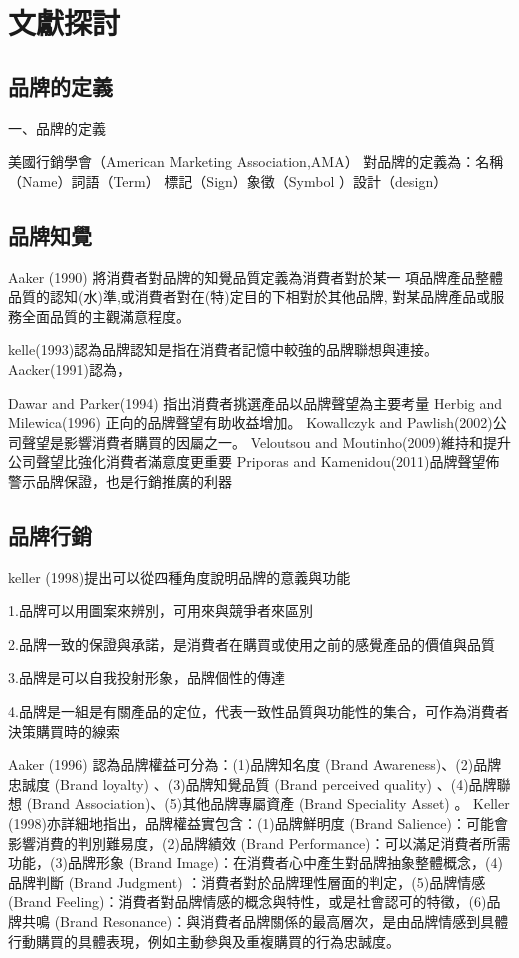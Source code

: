 \chapter{文獻探討}


\section{品牌的定義}

一、品牌的定義

美國行銷學會（American Marketing Association,AMA）
對品牌的定義為：名稱 （Name）詞語（Term） 標記（Sign）象徵（Symbol ）設計（design）


\section{品牌知覺}
Aaker (1990) 將消費者對品牌的知覺品質定義為消費者對於某一 項品牌產品整體品質的認知(水)準,或消費者對在(特)定目的下相對於其他品牌, 對某品牌產品或服務全面品質的主觀滿意程度。

kelle(1993)認為品牌認知是指在消費者記憶中較強的品牌聯想與連接。Aacker(1991)認為，

Dawar and Parker(1994) 指出消費者挑選產品以品牌聲望為主要考量
Herbig and Milewica(1996) 正向的品牌聲望有助收益增加。
Kowallczyk and Pawlish(2002)公司聲望是影響消費者購買的因屬之一。
Veloutsou and Moutinho(2009)維持和提升公司聲望比強化消費者滿意度更重要
Priporas and Kamenidou(2011)品牌聲望佈警示品牌保證，也是行銷推廣的利器
\section{品牌行銷}

keller (1998)提出可以從四種角度說明品牌的意義與功能\cite{Aaker}

1.品牌可以用圖案來辨別，可用來與競爭者來區別

2.品牌一致的保證與承諾，是消費者在購買或使用之前的感覺產品的價值與品質

3.品牌是可以自我投射形象，品牌個性的傳達

4.品牌是一組是有關產品的定位，代表一致性品質與功能性的集合，可作為消費者決策購買時的線索

Aaker (1996) 認為品牌權益可分為：(1)品牌知名度 (Brand Awareness)、(2)品牌忠誠度 (Brand loyalty) 、(3)品牌知覺品質 (Brand perceived quality) 、(4)品牌聯想 (Brand Association)、(5)其他品牌專屬資產 (Brand Speciality Asset) 。
    Keller (1998)亦詳細地指出，品牌權益實包含：(1)品牌鮮明度 (Brand Salience)：可能會影響消費的判別難易度，(2)品牌績效 (Brand Performance)：可以滿足消費者所需功能，(3)品牌形象 (Brand Image)：在消費者心中產生對品牌抽象整體概念，(4)品牌判斷 (Brand Judgment) ：消費者對於品牌理性層面的判定，(5)品牌情感 (Brand Feeling)：消費者對品牌情感的概念與特性，或是社會認可的特徵，(6)品牌共鳴 (Brand Resonance)：與消費者品牌關係的最高層次，是由品牌情感到具體行動購買的具體表現，例如主動參與及重複購買的行為忠誠度。    

